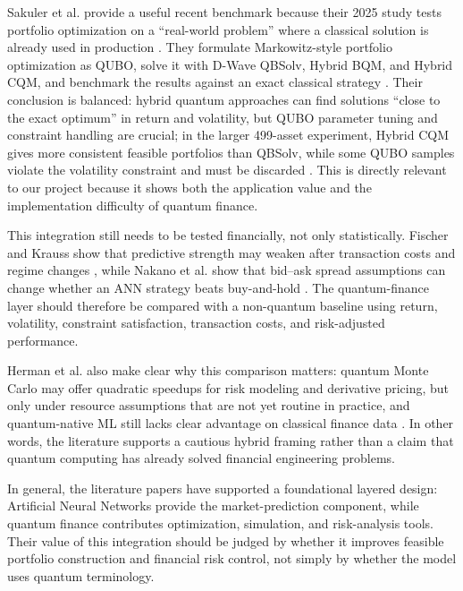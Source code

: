 \documentclass[conference]{IEEEtran}
\begin{document}
Sakuler et al. provide a useful recent benchmark because their 2025 study tests portfolio optimization on a ``real-world problem'' where a classical solution is already used in production \cite{sakuler2025real}. They formulate Markowitz-style portfolio optimization as QUBO, solve it with D-Wave QBSolv, Hybrid BQM, and Hybrid CQM, and benchmark the results against an exact classical strategy \cite{sakuler2025real}. Their conclusion is balanced: hybrid quantum approaches can find solutions ``close to the exact optimum'' in return and volatility, but QUBO parameter tuning and constraint handling are crucial; in the larger 499-asset experiment, Hybrid CQM gives more consistent feasible portfolios than QBSolv, while some QUBO samples violate the volatility constraint and must be discarded \cite{sakuler2025real}. This is directly relevant to our project because it shows both the application value and the implementation difficulty of quantum finance.

This integration still needs to be tested financially, not only statistically. Fischer and Krauss show that predictive strength may weaken after transaction costs and regime changes \cite{fischer2018deep}, while Nakano et al. show that bid--ask spread assumptions can change whether an ANN strategy beats buy-and-hold \cite{nakano2018bitcoin}. The quantum-finance layer should therefore be compared with a non-quantum baseline using return, volatility, constraint satisfaction, transaction costs, and risk-adjusted performance.

Herman et al. also make clear why this comparison matters: quantum Monte Carlo may offer quadratic speedups for risk modeling and derivative pricing, but only under resource assumptions that are not yet routine in practice, and quantum-native ML still lacks clear advantage on classical finance data \cite{herman2023quantum}. In other words, the literature supports a cautious hybrid framing rather than a claim that quantum computing has already solved financial engineering problems.

In general, the literature papers have supported a foundational layered design: Artificial Neural Networks provide the market-prediction component, while quantum finance contributes optimization, simulation, and risk-analysis tools. Their value of this integration should be judged by whether it improves feasible portfolio construction and financial risk control, not simply by whether the model uses quantum terminology.




\end{document}
